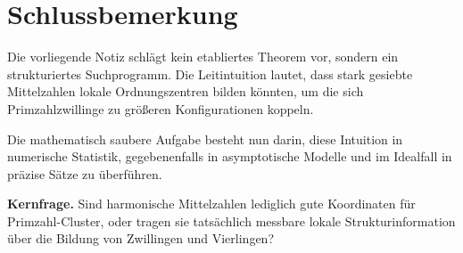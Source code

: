 \documentclass[11pt,a4paper]{article}
\theoremstyle{definition}
\theoremstyle{plain}
\theoremstyle{remark}
\begin{document}
	\section{Schlussbemerkung}
	
	Die vorliegende Notiz schlägt kein etabliertes Theorem vor, sondern ein strukturiertes Suchprogramm. 
	Die Leitintuition lautet, dass stark gesiebte Mittelzahlen lokale Ordnungszentren bilden könnten, um die sich Primzahlzwillinge zu größeren Konfigurationen koppeln. 
	
	Die mathematisch saubere Aufgabe besteht nun darin, diese Intuition in numerische Statistik, gegebenenfalls in asymptotische Modelle und im Idealfall in präzise Sätze zu überführen.
	
	\bigskip
	
	\noindent
	\textbf{Kernfrage.} 
	Sind harmonische Mittelzahlen lediglich gute Koordinaten für Primzahl-Cluster, oder tragen sie tatsächlich messbare lokale Strukturinformation über die Bildung von Zwillingen und Vierlingen?
	
\end{document}
